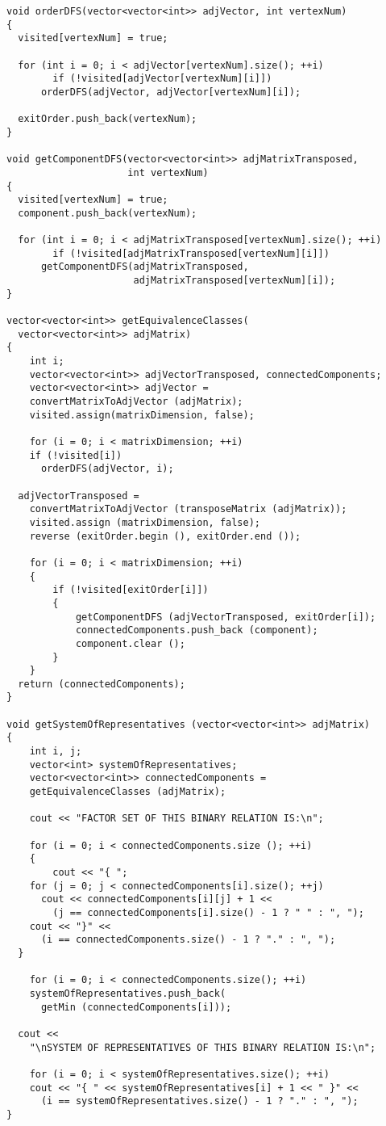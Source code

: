 \documentclass[spec, och, otchet, hidelinks]{SCWorks}
\begin{document}
\begin{lstlisting}[caption=Код программы и вспомогательных функций., mathescape]
void orderDFS(vector<vector<int>> adjVector, int vertexNum)
{
  visited[vertexNum] = true;

  for (int i = 0; i < adjVector[vertexNum].size(); ++i)
		if (!visited[adjVector[vertexNum][i]])
      orderDFS(adjVector, adjVector[vertexNum][i]);

  exitOrder.push_back(vertexNum);
}

void getComponentDFS(vector<vector<int>> adjMatrixTransposed,
                     int vertexNum) 
{
  visited[vertexNum] = true;
  component.push_back(vertexNum);

  for (int i = 0; i < adjMatrixTransposed[vertexNum].size(); ++i)
		if (!visited[adjMatrixTransposed[vertexNum][i]])
      getComponentDFS(adjMatrixTransposed,
                      adjMatrixTransposed[vertexNum][i]);
}

vector<vector<int>> getEquivalenceClasses(
  vector<vector<int>> adjMatrix)
{
	int i;
	vector<vector<int>> adjVectorTransposed, connectedComponents;
	vector<vector<int>> adjVector =
    convertMatrixToAdjVector (adjMatrix);
	visited.assign(matrixDimension, false);

	for (i = 0; i < matrixDimension; ++i)
    if (!visited[i])
      orderDFS(adjVector, i);

  adjVectorTransposed =
    convertMatrixToAdjVector (transposeMatrix (adjMatrix));
	visited.assign (matrixDimension, false);
	reverse (exitOrder.begin (), exitOrder.end ());

	for (i = 0; i < matrixDimension; ++i)
	{
		if (!visited[exitOrder[i]])
		{
			getComponentDFS (adjVectorTransposed, exitOrder[i]);
			connectedComponents.push_back (component);
			component.clear ();
		}
	}
  return (connectedComponents);
}

void getSystemOfRepresentatives (vector<vector<int>> adjMatrix)
{
	int i, j;
	vector<int> systemOfRepresentatives;
	vector<vector<int>> connectedComponents =
    getEquivalenceClasses (adjMatrix);

	cout << "FACTOR SET OF THIS BINARY RELATION IS:\n";

	for (i = 0; i < connectedComponents.size (); ++i)
	{
		cout << "{ ";
    for (j = 0; j < connectedComponents[i].size(); ++j)
      cout << connectedComponents[i][j] + 1 <<
        (j == connectedComponents[i].size() - 1 ? " " : ", ");
    cout << "}" <<
      (i == connectedComponents.size() - 1 ? "." : ", ");
  }

	for (i = 0; i < connectedComponents.size(); ++i)
    systemOfRepresentatives.push_back(
      getMin (connectedComponents[i]));

  cout <<
    "\nSYSTEM OF REPRESENTATIVES OF THIS BINARY RELATION IS:\n";

	for (i = 0; i < systemOfRepresentatives.size(); ++i)
    cout << "{ " << systemOfRepresentatives[i] + 1 << " }" <<
      (i == systemOfRepresentatives.size() - 1 ? "." : ", ");
}
\end{lstlisting}
\end{document}
